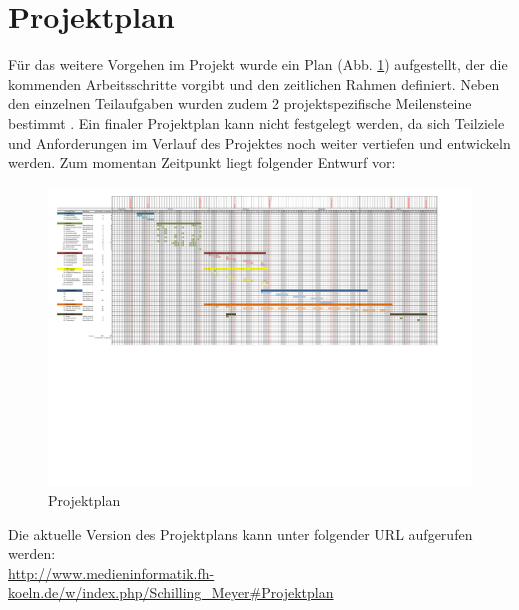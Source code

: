 
\section{Projektplan}
Für das weitere Vorgehen im Projekt wurde ein Plan (Abb. \ref{fig:projektplan}) aufgestellt, der die kommenden Arbeitsschritte vorgibt und den zeitlichen Rahmen definiert. Neben den einzelnen Teilaufgaben wurden zudem 2 projektspezifische Meilensteine bestimmt . Ein finaler Projektplan kann nicht festgelegt werden, da sich Teilziele und Anforderungen im Verlauf des Projektes noch weiter vertiefen und entwickeln werden. Zum momentan Zeitpunkt liegt folgender Entwurf vor:

\begin{figure}[H]
\includegraphics[width=.9\textwidth, trim=20 250 150 0]{./images/projektplan.pdf}
\caption{Projektplan}
\label{fig:projektplan}
\end{figure}

Die aktuelle Version des Projektplans kann unter folgender URL aufgerufen werden:\\
\url{http://www.medieninformatik.fh-koeln.de/w/index.php/Schilling_Meyer#Projektplan}
